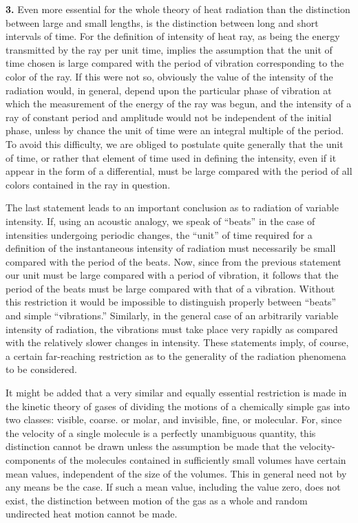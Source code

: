 \documentclass[12pt,oneside]{book}
\begin{document}
\textbf{3.} Even more essential for the whole theory of heat radiation than the distinction between large and small lengths, is the distinction between long and short intervals of time. For the definition of intensity of heat ray, as being the energy transmitted by the ray per unit time, implies the assumption that the unit of time chosen is large compared with the period of vibration corresponding to the color of the ray. If this were not so, obviously the value of the intensity of the radiation would, in general, depend upon the particular phase of vibration at which the measurement of the energy of the ray was begun, and the intensity of a ray of constant period and amplitude would not be independent of the initial phase, unless by chance the unit of time were an integral multiple of the period. To avoid this difficulty, we are obliged to postulate quite generally that the unit of time, or rather that element of time used in defining the intensity, even if it appear in the form of a differential, must be large compared with the period of all colors contained in the ray in question. \par 

The last statement leads to an important conclusion as to radiation of variable intensity. If, using an acoustic analogy, we speak of ``beats'' in the case of intensities undergoing periodic changes, the ``unit'' of time required for a definition of the instantaneous intensity of radiation must necessarily be small compared with the period of the beats. Now, since from the previous statement our unit must be large compared with a period of vibration, it follows that the period of the beats must be large compared with that of a vibration. Without this restriction it would be impossible to distinguish properly between ``beats'' and simple ``vibrations.'' Similarly, in the general case of an arbitrarily variable intensity of radiation, the vibrations must take place very rapidly as compared with the relatively slower changes in intensity. These statements imply, of course, a certain far-reaching restriction as to the generality of the radiation phenomena to be considered. \par 

It might be added that a very similar and equally essential restriction is made in the kinetic theory of gases of dividing the motions of a chemically simple gas into two classes: visible, coarse. or molar, and invisible, fine, or molecular. For, since the velocity of a single molecule is a perfectly unambiguous quantity, this distinction cannot be drawn unless the assumption be made that the velocity-components of the molecules contained in sufficiently small volumes have certain mean values, independent of the size of the volumes. This in general need not by any means be the case. If such a mean value, including the value zero, does not exist, the distinction between motion of the gas as a whole and random undirected heat motion cannot be made. \par 
\end{document}
